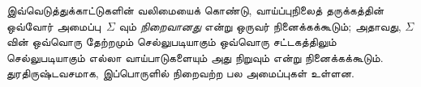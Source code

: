 \documentclass[../../../include/open-logic-section]{subfiles}
\begin{document}
இவ்வெடுத்துக்காட்டுகளின் வலிமையைக் கொண்டு, வாய்ப்புநிலைத் தருக்கத்தின் ஒவ்வோர்
அமைப்பு~$\Sigma$ வும் \emph{நிறைவானது} என்று ஒருவர் நினைக்கக்கூடும்; அதாவது,
$\Sigma$ வின் ஒவ்வொரு தேற்றமும் செல்லுபடியாகும் ஒவ்வொரு சட்டகத்திலும்
செல்லுபடியாகும் எல்லா வாய்பாடுகளையும் அது நிறுவும் என்று நினைக்கக்கூடும்.
துரதிருஷ்டவசமாக, இப்பொருளில் நிறைவற்ற பல அமைப்புகள் உள்ளன.
\end{document}
